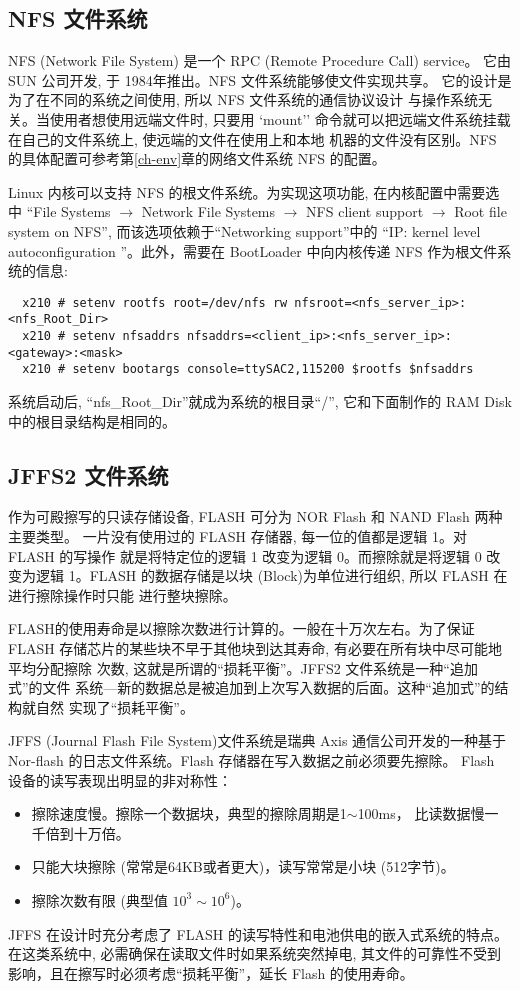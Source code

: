 \subsection{NFS 文件系统}
NFS (Network File System) 是一个 RPC (Remote Procedure Call) service。
它由 SUN 公司开发, 于 1984年推出。NFS 文件系统能够使文件实现共享。
它的设计是为了在不同的系统之间使用, 所以 NFS 文件系统的通信协议设计
与操作系统无关。当使用者想使用远端文件时, 只要用 `mount''
命令就可以把远端文件系统挂载在自己的文件系统上, 使远端的文件在使用上和本地
机器的文件没有区别。NFS 的具体配置可参考第\ref{ch-env}章的网络文件系统 NFS
的配置。

Linux 内核可以支持 NFS 的根文件系统。为实现这项功能, 在内核配置中需要选中
``File Systems $\to$ Network File Systems $\to$  NFS client support  $\to$
 Root file system on NFS'', 而该选项依赖于``Networking support''中的
``IP: kernel level autoconfiguration ''。此外，需要在 BootLoader 中向内核传递
NFS 作为根文件系统的信息:
\begin{verbatim}
  x210 # setenv rootfs root=/dev/nfs rw nfsroot=<nfs_server_ip>:<nfs_Root_Dir>
  x210 # setenv nfsaddrs nfsaddrs=<client_ip>:<nfs_server_ip>:<gateway>:<mask>
  x210 # setenv bootargs console=ttySAC2,115200 $rootfs $nfsaddrs
\end{verbatim}

系统启动后, ``nfs\_Root\_Dir''就成为系统的根目录``/'', 它和下面制作的
RAM Disk 中的根目录结构是相同的。

\subsection{JFFS2 文件系统}

作为可殿擦写的只读存储设备, FLASH 可分为 NOR Flash 和 NAND Flash 两种主要类型。
一片没有使用过的 FLASH 存储器, 每一位的值都是逻辑 1。对 FLASH 的写操作
就是将特定位的逻辑 1 改变为逻辑 0。而擦除就是将逻辑 0 改变为逻辑 1。FLASH
的数据存储是以块 (Block)为单位进行组织, 所以 FLASH 在进行擦除操作时只能
进行整块擦除。

FLASH的使用寿命是以擦除次数进行计算的。一般在十万次左右。为了保证 FLASH
存储芯片的某些块不早于其他块到达其寿命, 有必要在所有块中尽可能地平均分配擦除
次数, 这就是所谓的``损耗平衡''。JFFS2 文件系统是一种``追加式''的文件
系统---新的数据总是被追加到上次写入数据的后面。这种``追加式''的结构就自然
实现了``损耗平衡''。

JFFS (Journal Flash File System)文件系统是瑞典 Axis 通信公司开发的一种基于
Nor-flash 的日志文件系统。Flash 存储器在写入数据之前必须要先擦除。
Flash 设备的读写表现出明显的非对称性：
\begin{itemize}
    \item 擦除速度慢。擦除一个数据块，典型的擦除周期是1$\sim$100ms，
        比读数据慢一千倍到十万倍。
    \item 只能大块擦除 (常常是64KB或者更大)，读写常常是小块 (512字节)。
    \item 擦除次数有限 (典型值 $10^3\sim10^6$)。
\end{itemize}
JFFS 在设计时充分考虑了 FLASH 的读写特性和电池供电的嵌入式系统的特点。
在这类系统中, 必需确保在读取文件时如果系统突然掉电, 其文件的可靠性不受到
影响，且在擦写时必须考虑``损耗平衡''，延长 Flash 的使用寿命。

